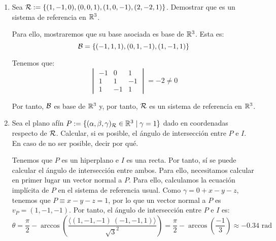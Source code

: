 \documentclass[12pt]{article}
\begin{document}
\begin{ejercicio}
\begin{enumerate}
            \item Sea $\mathcal{R}:=\{(1,-1,0), (0,0,1), (1,0,-1), (2,-2,1)\}$. Demostrar que es un sistema de referencia en $\mathbb{R}^3$.
            
            Para ello, mostraremos que su base asociada es base de $\mathbb{R}^3$. Esta es:
            \begin{equation*}
                \mathcal{B} = \left\{(-1, 1, 1), (0, 1, -1), (1, -1, 1)\right\}
            \end{equation*}

            Tenemos que:
            \begin{equation*}
                \begin{vmatrix}
                    -1 & 0 & 1 \\
                    1 & 1 & -1 \\
                    1 & -1 & 1
                \end{vmatrix} = -2 \neq 0
            \end{equation*}

            Por tanto, $\mathcal{B}$ es base de $\mathbb{R}^3$ y, por tanto, $\mathcal{R}$ es un sistema de referencia en $\mathbb{R}^3$.

            \item Sea el plano afín $P:= \{(\alpha,\beta,\gamma)_{\mathcal{R}}\in \mathbb{R}^3\mid \gamma=1\}$ dado en coordenadas respecto de $\mathcal{R}$. Calcular, si es posible, el ángulo de intersección entre $P$ e $I$. En caso de no ser posible, decir por qué.
            
            Tenemos que $P$ es un hiperplano e $I$ es una recta. Por tanto, sí se puede calcular el ángulo de intersección entre ambos.
            Para ello, necesitamos calcular en primer lugar un vector normal a $P$. Para ello, calculamos la ecuación implícita de $P$ en el sistema de referencia usual.
            Como $\gamma = 0+x-y-z$, tenemos que $P\equiv x-y-z=1$,
            por lo que un vector normal a $P$ es $v_P=(1,-1,-1)$.
            Por tanto, el ángulo de intersección entre $P$ e $I$ es:
            \begin{equation*}
                \theta  =\frac{\pi}{2}- \arccos\left(\frac{\langle (1,-1,-1)~(-1,-1,1)\rangle}{\sqrt{3}^2}\right)
                =\frac{\pi}{2}- \arccos\left(\frac{-1}{3}\right)
                \approx -0.34 \text{ rad}
            \end{equation*}
        \end{enumerate}
    \end{ejercicio}
\end{document}
